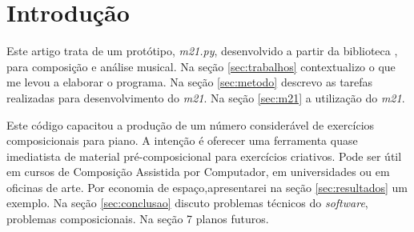 \section{Introdução}

Este artigo trata de um protótipo, \emph{m21.py},  desenvolvido a partir da biblioteca \cite{music21_2015}, para composição e análise musical. Na seção \ref{sec:trabalhos} contextualizo o que me levou a elaborar o programa.  Na seção \ref{sec:metodo} descrevo as tarefas realizadas para desenvolvimento do \emph{m21}. Na seção \ref{sec:m21} a utilização do \emph{m21}. 

Este código capacitou a produção de um número considerável de exercícios composicionais para piano. A intenção é oferecer uma ferramenta quase imediatista de material pré-composicional para exercícios criativos. Pode ser útil em cursos de Composição Assistida por Computador, em universidades ou em oficinas de arte. Por economia de espaço,apresentarei na seção \ref{sec:resultados} um exemplo. Na seção \ref{sec:conclusao} discuto problemas técnicos do \emph{software}, problemas composicionais. Na seção 7 planos futuros.